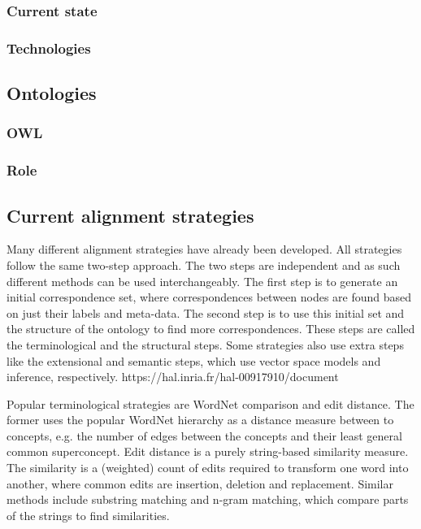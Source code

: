 \documentclass{article}
\begin{document}
 \subsubsection{Current state}
 
 \subsubsection{Technologies}
 \subsection{Ontologies}
 \subsubsection{OWL}
 \subsubsection{Role}
 \subsection{Current alignment strategies}
 Many different alignment strategies have already been developed. All strategies follow the same two-step approach. The two steps are independent and as such different methods can be used interchangeably. The first step is to generate an initial correspondence set, where correspondences between nodes are found based on just their labels and meta-data. The second step is to use this initial set and the structure of the ontology to find more correspondences. These steps are called the terminological and the structural steps. Some strategies also use extra steps like the extensional and semantic steps, which use vector space models and inference, respectively. https://hal.inria.fr/hal-00917910/document
 
 Popular terminological strategies are WordNet comparison and edit distance. The former uses the popular WordNet hierarchy as a distance measure between to concepts, e.g. the number of edges between the concepts and their least general common superconcept. %
 Edit distance is a purely string-based similarity measure. The similarity is a (weighted) count of edits required to transform one word into another, where common edits are insertion, deletion and replacement. Similar methods include substring matching and n-gram matching, which compare parts of the strings to find similarities. %
\end{document}
